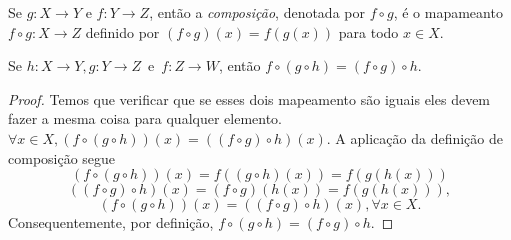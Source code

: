 \begin{definition}
  Se $g:X \to Y$ e $f:Y \to Z$, então a \emph{composição}, denotada por $f \circ g$, é o mapameanto $f \circ g: X \to Z$ definido por $(f \circ g)(x) = f(g(x))$ para todo $x \in X$.
\end{definition}
\begin{lemma}\label{comp-assoc}
  Se $h:X \to Y, g:Y \to Z$\ e\ $f:Z \to W$, então $f\circ (g\circ h) = (f \circ g)\circ h.$
  \begin{proof}
    Temos que verificar que se esses dois mapeamento são iguais eles devem fazer a mesma coisa para qualquer elemento.\\
    $\forall x \in X, (f\circ(g\circ h))(x) = ((f \circ g)\circ h)(x).$ A aplicação da definição de composição segue $$(f\circ (g\circ h))(x)=f((g\circ h)(x))=f(g(h(x)))$$ $$((f\circ g)\circ h)(x)=(f\circ g)(h(x))=f(g(h(x))),$$ $$(f\circ (g \circ h))(x)=((f \circ g)\circ h)(x), \forall x \in X.$$
    Consequentemente, por definição, $f \circ (g \circ h) = (f\circ g) \circ h.$
  \end{proof}
\end{lemma}

